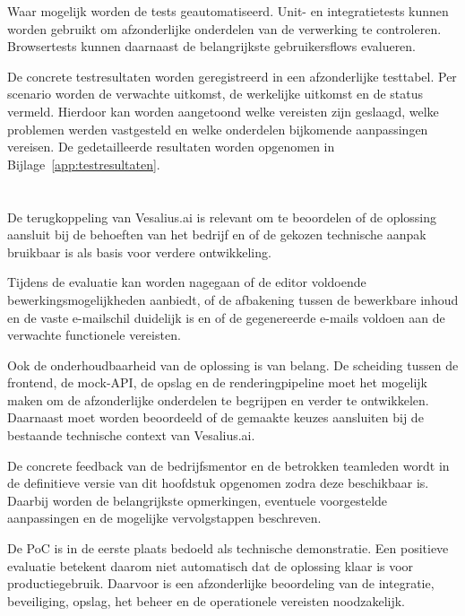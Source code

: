 Waar mogelijk worden de tests geautomatiseerd. Unit- en integratietests
kunnen worden gebruikt om afzonderlijke onderdelen van de verwerking te
controleren. Browsertests kunnen daarnaast de belangrijkste gebruikersflows
evalueren.

De concrete testresultaten worden geregistreerd in een afzonderlijke
testtabel. Per scenario worden de verwachte uitkomst, de werkelijke
uitkomst en de status vermeld. Hierdoor kan worden aangetoond welke
vereisten zijn geslaagd, welke problemen werden vastgesteld en welke
onderdelen bijkomende aanpassingen vereisen. De gedetailleerde resultaten
worden opgenomen in Bijlage~\ref{app:testresultaten}.

\section{}%
\label{sec:terugkoppeling}
De terugkoppeling van Vesalius.ai is relevant om te beoordelen of de
oplossing aansluit bij de behoeften van het bedrijf en of de gekozen
technische aanpak bruikbaar is als basis voor verdere ontwikkeling.

Tijdens de evaluatie kan worden nagegaan of de editor voldoende
bewerkingsmogelijkheden aanbiedt, of de afbakening tussen de bewerkbare
inhoud en de vaste e-mailschil duidelijk is en of de gegenereerde e-mails
voldoen aan de verwachte functionele vereisten.

Ook de onderhoudbaarheid van de oplossing is van belang. De scheiding tussen
de frontend, de mock-API, de opslag en de renderingpipeline moet het mogelijk
maken om de afzonderlijke onderdelen te begrijpen en verder te ontwikkelen.
Daarnaast moet worden beoordeeld of de gemaakte keuzes aansluiten bij de
bestaande technische context van Vesalius.ai.

De concrete feedback van de bedrijfsmentor en de betrokken teamleden wordt
in de definitieve versie van dit hoofdstuk opgenomen zodra deze beschikbaar
is. Daarbij worden de belangrijkste opmerkingen, eventuele voorgestelde
aanpassingen en de mogelijke vervolgstappen beschreven.

De PoC is in de eerste plaats bedoeld als technische demonstratie. Een
positieve evaluatie betekent daarom niet automatisch dat de oplossing
klaar is voor productiegebruik. Daarvoor is een afzonderlijke beoordeling
van de integratie, beveiliging, opslag, het beheer en de operationele
vereisten noodzakelijk.

